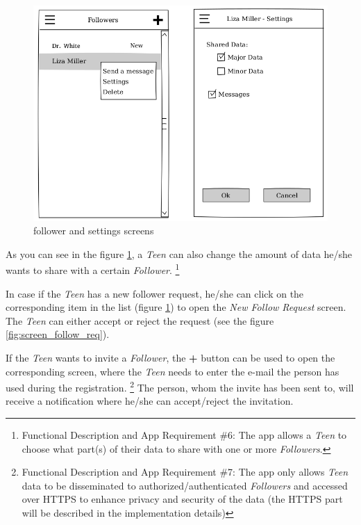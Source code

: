 \documentclass{article}
\begin{document}
    \begin{figure}[h]
        \centering
        \includegraphics[width=\textwidth,height=\textheight,keepaspectratio]{followers.png}
        \caption{follower and settings screens}
        \label{fig:screen_followers}
    \end{figure}

    As you can see in the figure \ref{fig:screen_followers}, a \emph{Teen} can also change the amount of data he/she wants to share with a certain \emph{Follower}.
    \footnote{Functional Description and App Requirement \#6: The app allows a \emph{Teen} to choose what part(s) of their data to share with one or more \emph{Followers}.}

\newpage

In case if the \emph{Teen} has a new follower request, he/she can click on the corresponding item in the list (figure \ref{fig:screen_followers}) to open the \emph{New Follow Request} screen. The \emph{Teen} can  either accept or reject the request (see the figure \ref{fig:screen_follow_req}).
    
    If the \emph{Teen} wants to invite a \emph{Follower}, the \textbf{+} button can be used to open the corresponding screen, where the \emph{Teen} needs to enter the e-mail the person has used during the registration.
    \footnote{Functional Description and App Requirement \#7: The app only allows \emph{Teen} data to be disseminated to authorized/authenticated \emph{Followers} and accessed over HTTPS to enhance privacy and security of the data (the HTTPS part will be described in the implementation details)}
    The person, whom the invite has been sent to, will receive a notification where he/she can accept/reject the invitation.
\end{document}
